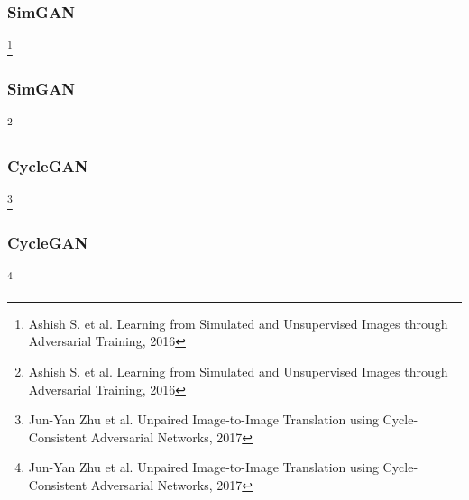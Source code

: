 \documentclass[14pt,aspectratio=169]{beamer}
\newcommand\blfootnote[1]{%
  \begingroup
  \renewcommand\thefootnote{}\footnote{#1}%
  \addtocounter{footnote}{-1}%
  \endgroup
}
\begin{document}
\begin{frame}
\frametitle{SimGAN}
\blfootnote{Ashish S. et al. Learning from Simulated and Unsupervised Images through Adversarial
Training, 2016}
\end{frame}

\begin{frame}
\frametitle{SimGAN}
\blfootnote{Ashish S. et al. Learning from Simulated and Unsupervised Images through Adversarial
Training, 2016}
\end{frame}

\begin{frame}
\frametitle{CycleGAN}
\blfootnote{Jun-Yan Zhu et al. Unpaired Image-to-Image Translation
using Cycle-Consistent Adversarial Networks, 2017}
\end{frame}

\begin{frame}
\frametitle{CycleGAN}
\blfootnote{Jun-Yan Zhu et al. Unpaired Image-to-Image Translation
using Cycle-Consistent Adversarial Networks, 2017}
\end{frame}
\end{document}
